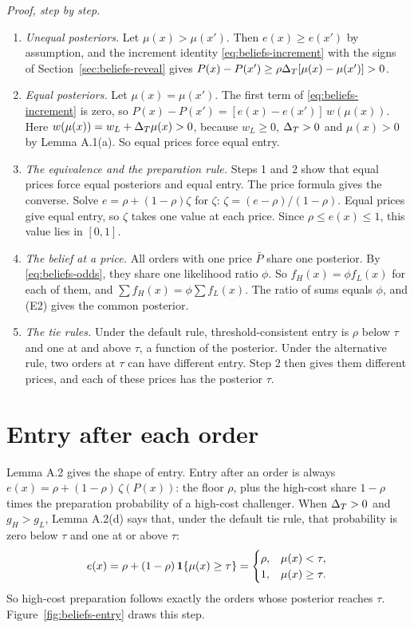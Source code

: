 \emph{Proof, step by step.}
\begin{enumerate}
\item \emph{Unequal posteriors.} Let \(\mu(x)>\mu(x')\). Then \(e(x)\ge e(x')\) by assumption, and the increment identity \eqref{eq:beliefs-increment} with the signs of Section~\ref{sec:beliefs-reveal} gives \(P(x)-P(x')\ge\rho\Delta_T[\mu(x)-\mu(x')]>0\).
\item \emph{Equal posteriors.} Let \(\mu(x)=\mu(x')\). The first term of \eqref{eq:beliefs-increment} is zero, so \(P(x)-P(x')=[e(x)-e(x')]\,w(\mu(x))\). Here \(w(\mu(x))=w_L+\Delta_T\mu(x)>0\), because \(w_L\ge0\), \(\Delta_T>0\) and \(\mu(x)>0\) by Lemma A.1(a). So equal prices force equal entry.
\item \emph{The equivalence and the preparation rule.} Steps 1 and 2 show that equal prices force equal posteriors and equal entry. The price formula gives the converse. Solve \(e=\rho+(1-\rho)\zeta\) for \(\zeta\): \(\zeta=(e-\rho)/(1-\rho)\). Equal prices give equal entry, so \(\zeta\) takes one value at each price. Since \(\rho\le e(x)\le1\), this value lies in \([0,1]\).
\item \emph{The belief at a price.} All orders with one price \(\bar P\) share one posterior. By \eqref{eq:beliefs-odds}, they share one likelihood ratio \(\phi\). So \(f_H(x)=\phi f_L(x)\) for each of them, and \(\sum f_H(x)=\phi\sum f_L(x)\). The ratio of sums equals \(\phi\), and (E2) gives the common posterior.
\item \emph{The tie rules.} Under the default rule, threshold-consistent entry is \(\rho\) below \(\tau\) and one at and above \(\tau\), a function of the posterior. Under the alternative rule, two orders at \(\tau\) can have different entry. Step 2 then gives them different prices, and each of these prices has the posterior \(\tau\).
\end{enumerate}

\section{Entry after each order}\label{sec:beliefs-entry}

Lemma A.2 gives the shape of entry. Entry after an order is always \(e(x)=\rho+(1-\rho)\,\zeta(P(x))\): the floor \(\rho\), plus the high-cost share \(1-\rho\) times the preparation probability of a high-cost challenger. When \(\Delta_T>0\) and \(g_H>g_L\), Lemma A.2(d) says that, under the default tie rule, that probability is zero below \(\tau\) and one at or above \(\tau\):
\[
e(x)=\rho+(1-\rho)\,\mathbf{1}\{\mu(x)\ge\tau\}=
\begin{cases}\rho, & \mu(x)<\tau,\\ 1, & \mu(x)\ge\tau.\end{cases}
\]
So high-cost preparation follows exactly the orders whose posterior reaches \(\tau\). Figure~\ref{fig:beliefs-entry} draws this step.

